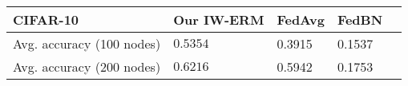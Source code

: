     \begin{tabular}{lllll}
    \toprule
    {{CIFAR-10}} &   \textbf{Our IW-ERM}  & FedAvg & FedBN \\
    \midrule
    {Avg. accuracy (100 nodes)} &  $\boldsymbol{0.5354}$    &   0.3915   &   0.1537          \\
    \midrule
    {Avg. accuracy (200 nodes)} &  $\boldsymbol{0.6216}$    &   0.5942   &   0.1753          \\
    \bottomrule
    \end{tabular}
